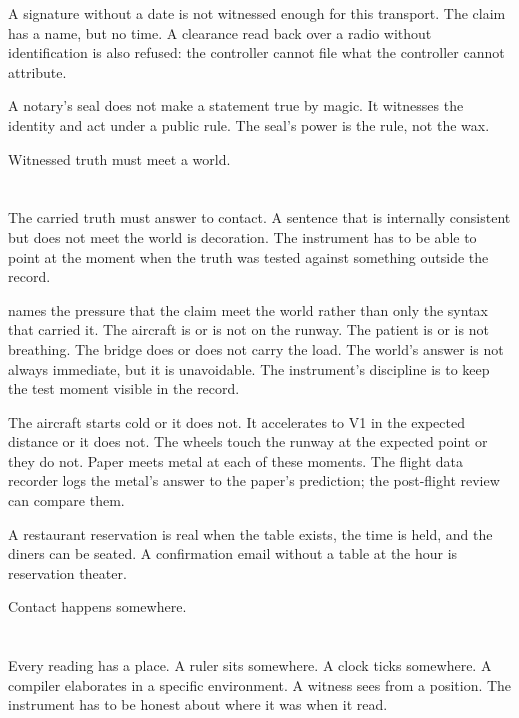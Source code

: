A signature without a date is not witnessed enough for this transport.
The claim has a name, but no time. A clearance read back over a radio
without identification is also refused: the controller cannot file
what the controller cannot attribute.

A notary's seal does not make a statement true by magic. It witnesses
the identity and act under a public rule. The seal's power is the
rule, not the wax.

Witnessed truth must meet a world.

\section{}
\label{se:real}

The carried truth must answer to contact. A sentence that is
internally consistent but does not meet the world is decoration. The
instrument has to be able to point at the moment when the truth was
tested against something outside the record.

 names the pressure that the claim meet the world rather
than only the syntax that carried it. The aircraft is or is not on
the runway. The patient is or is not breathing. The bridge does or
does not carry the load. The world's answer is not always immediate,
but it is unavoidable. The instrument's discipline is to keep the
test moment visible in the record.

The aircraft starts cold or it does not. It accelerates to V1 in the
expected distance or it does not. The wheels touch the runway at the
expected point or they do not. Paper meets metal at each of these
moments. The flight data recorder logs the metal's answer to the
paper's prediction; the post-flight review can compare them.

A restaurant reservation is real when the table exists, the time is
held, and the diners can be seated. A confirmation email without a
table at the hour is reservation theater.

Contact happens somewhere.

\section{}
\label{se:local}

Every reading has a place. A ruler sits somewhere. A clock ticks
somewhere. A compiler elaborates in a specific environment. A witness
sees from a position. The instrument has to be honest about where it
was when it read.

